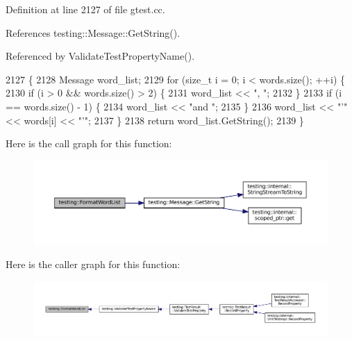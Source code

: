 Definition at line 2127 of file gtest.\+cc.



References testing\+::\+Message\+::\+Get\+String().



Referenced by Validate\+Test\+Property\+Name().


\begin{DoxyCode}
2127                                                                    \{
2128   Message word\_list;
2129   \textcolor{keywordflow}{for} (\textcolor{keywordtype}{size\_t} i = 0; i < words.size(); ++i) \{
2130     \textcolor{keywordflow}{if} (i > 0 && words.size() > 2) \{
2131       word\_list << \textcolor{stringliteral}{", "};
2132     \}
2133     \textcolor{keywordflow}{if} (i == words.size() - 1) \{
2134       word\_list << \textcolor{stringliteral}{"and "};
2135     \}
2136     word\_list << \textcolor{stringliteral}{"'"} << words[i] << \textcolor{stringliteral}{"'"};
2137   \}
2138   \textcolor{keywordflow}{return} word\_list.GetString();
2139 \}
\end{DoxyCode}
Here is the call graph for this function\+:
\nopagebreak
\begin{figure}[H]
\begin{center}
\leavevmode
\includegraphics[width=350pt]{namespacetesting_a4354761948a5cf56fdf905418a0f78f1_cgraph}
\end{center}
\end{figure}
Here is the caller graph for this function\+:
\nopagebreak
\begin{figure}[H]
\begin{center}
\leavevmode
\includegraphics[width=350pt]{namespacetesting_a4354761948a5cf56fdf905418a0f78f1_icgraph}
\end{center}
\end{figure}
\mbox{\label{namespacetesting_a42bb19b42d7830b972973a103d5e00f2}} 
